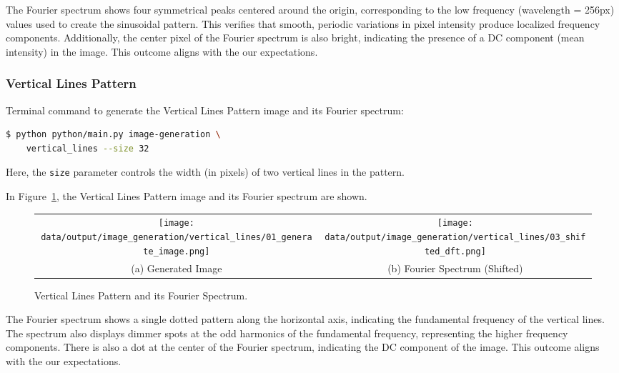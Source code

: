 \documentclass[a4paper,12pt]{article}
\begin{document}
The Fourier spectrum shows four symmetrical peaks centered around the origin, corresponding to the low frequency (wavelength = 256px) values used to create the sinusoidal pattern. This verifies that smooth, periodic variations in pixel intensity produce localized frequency components. Additionally, the center pixel of the Fourier spectrum is also bright, indicating the presence of a DC component (mean intensity) in the image. This outcome aligns with the our expectations.

\subsubsection{Vertical Lines Pattern}

Terminal command to generate the Vertical Lines Pattern image and its Fourier spectrum:

\begin{lstlisting}[language=bash]
$ python python/main.py image-generation \
    vertical_lines --size 32
\end{lstlisting}

Here, the \texttt{size} parameter controls the width (in pixels) of two vertical lines in the pattern.

In Figure~\ref{fig:vertical-lines-pattern}, the Vertical Lines Pattern image and its Fourier spectrum are shown.

\begin{figure}
    \begin{tabular}{cc}
        \texttt{[image: data/output/image\_generation/vertical\_lines/01\_generate\_image.png]} &
        \texttt{[image: data/output/image\_generation/vertical\_lines/03\_shifted\_dft.png]} \\
        (a) Generated Image & (b) Fourier Spectrum (Shifted) \\
    \end{tabular}
    \caption{\label{fig:vertical-lines-pattern} Vertical Lines Pattern and its Fourier Spectrum.}
\end{figure}

The Fourier spectrum shows a single dotted pattern along the horizontal axis, indicating the fundamental frequency of the vertical lines. The spectrum also displays dimmer spots at the odd harmonics of the fundamental frequency, representing the higher frequency components. There is also a dot at the center of the Fourier spectrum, indicating the DC component of the image. This outcome aligns with the our expectations.
\end{document}
